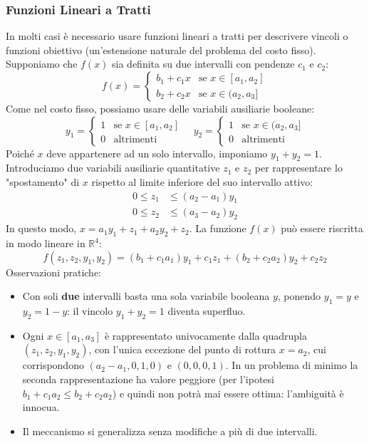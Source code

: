 \documentclass[12pt]{extarticle} %
\begin{document}
\subsubsection{Funzioni Lineari a Tratti}
In molti casi è necessario usare funzioni lineari a tratti per descrivere vincoli o funzioni obiettivo (un'estensione naturale del problema del costo fisso).
Supponiamo che $f(x)$ sia definita su due intervalli con pendenze $c_1$ e $c_2$:
\[
f(x) = \begin{cases}
b_1 + c_1 x & \text{se } x \in [a_1, a_2] \\
b_2 + c_2 x & \text{se } x \in (a_2, a_3]
\end{cases}
\]
Come nel costo fisso, possiamo usare delle variabili ausiliarie booleane:
\[
y_1 = \begin{cases} 1 & \text{se } x \in [a_1, a_2] \\ 0 & \text{altrimenti} \end{cases} \quad
y_2 = \begin{cases} 1 & \text{se } x \in (a_2, a_3] \\ 0 & \text{altrimenti} \end{cases}
\]
Poiché $x$ deve appartenere ad un solo intervallo, imponiamo $y_1 + y_2 = 1$.
Introduciamo due variabili ausiliarie quantitative $z_1$ e $z_2$ per rappresentare lo "spostamento" di $x$ rispetto al limite inferiore del suo intervallo attivo:
\begin{align*}
0 \le z_1 &\le (a_2 - a_1)y_1 \\
0 \le z_2 &\le (a_3 - a_2)y_2
\end{align*}
In questo modo, $x = a_1 y_1 + z_1 + a_2 y_2 + z_2$.
La funzione $f(x)$ può essere riscritta in modo lineare in $\mathbb{R}^4$:
\[
f(z_1, z_2, y_1, y_2) = (b_1 + c_1 a_1)y_1 + c_1 z_1 + (b_2 + c_2 a_2)y_2 + c_2 z_2
\]
Osservazioni pratiche:
\begin{itemize}
    \item Con soli \textbf{due} intervalli basta una sola variabile booleana $y$, ponendo $y_1 = y$ e $y_2 = 1-y$: il vincolo $y_1+y_2=1$ diventa superfluo.
    \item Ogni $x\in[a_1,a_3]$ è rappresentato univocamente dalla quadrupla $(z_1,z_2,y_1,y_2)$, con l'unica eccezione del punto di rottura $x=a_2$, cui corrispondono $(a_2-a_1,0,1,0)$ e $(0,0,0,1)$. In un problema di minimo la seconda rappresentazione ha valore peggiore (per l'ipotesi $b_1+c_1a_2 \le b_2+c_2a_2$) e quindi non potrà mai essere ottima: l'ambiguità è innocua.
    \item Il meccanismo si generalizza senza modifiche a più di due intervalli.
\end{itemize}
\end{document}
